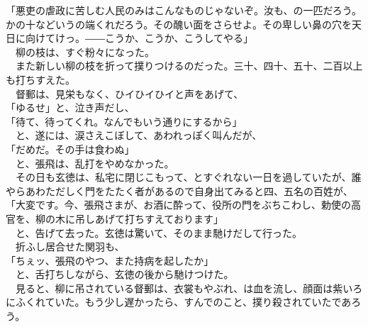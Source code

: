 \documentclass[
  paper=a5,
  fontsize=10pt,
  jafontsize=9.5pt,
  tate,                  %
  open_bracket_pos=nibu, %
]{jlreq}
\begin{document}
「悪吏の虐政に苦しむ人民のみはこんなものじゃないぞ。汝も、の一匹だろう。かの十などいうの端くれだろう。その醜い面をさらせよ。その卑しい鼻の穴を天日に向けてけっ。――こうか、こうか、こうしてやる」\\


　柳の枝は、すぐ粉々になった。\\


　また新しい柳の枝を折って撲りつけるのだった。三十、四十、五十、二百以上も打ちすえた。\\


　督郵は、見栄もなく、ひイひイひイと声をあげて、\\


「ゆるせ」と、泣き声だし、\\


「待て、待ってくれ。なんでもいう通りにするから」\\


　と、遂には、涙さえこぼして、あわれっぽく叫んだが、\\


「だめだ。その手は食わぬ」\\


　と、張飛は、乱打をやめなかった。\\


　その日も玄徳は、私宅に閉じこもって、とすぐれない一日を過していたが、誰やらあわただしく門をたたく者があるので自身出てみると四、五名の百姓が、\\


「大変です。今、張飛さまが、お酒に酔って、役所の門をぶちこわし、勅使の高官を、柳の木に吊しあげて打ちすえております」\\


　と、告げて去った。玄徳は驚いて、そのまま馳けだして行った。\\


　折ふし居合せた関羽も、\\


「ちぇッ、張飛のやつ、また持病を起したか」\\


　と、舌打ちしながら、玄徳の後から馳けつけた。\\


　見ると、柳に吊されている督郵は、衣裳もやぶれ、は血を流し、顔面は紫いろにふくれていた。もう少し遅かったら、すんでのこと、撲り殺されていたであろう。\\
\end{document}
